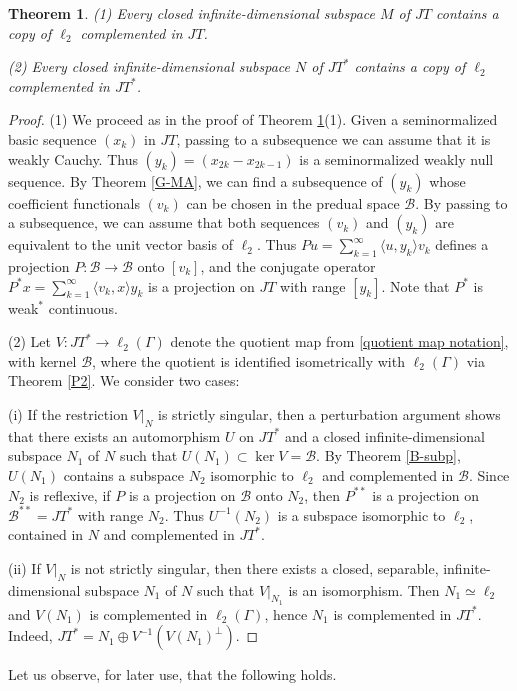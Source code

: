 \documentclass[12pt]{amsart}
\theoremstyle{plain}
\numberwithin{equation}{section}
\newcommand{\B}{\mathcal{B}}
\newtheorem{theorem}{Theorem}[section]
\begin{document}
\begin{theorem}\label{JT-subp}
(1) Every closed infinite-dimensional subspace $M$ of $JT$ contains a copy of $\ell_2$ complemented in $JT$.

(2) Every closed infinite-dimensional subspace $N$ of $JT^*$ contains a copy of $\ell_2$ complemented in $JT^*$.
\end{theorem}
\begin{proof} 
(1) We proceed as in the proof of Theorem \ref{JT-subp}(1).
Given a seminormalized basic sequence $(x_k)$ in $JT$, passing to a subsequence we can assume that it is weakly Cauchy.
Thus $(y_k)= (x_{2k}-x_{2k-1})$ is a seminormalized weakly null sequence.
By Theorem \ref{G-MA}, we can find a subsequence of $(y_k)$ whose coefficient functionals $(v_k)$ can be chosen in the predual space $\B$.
By passing to a subsequence, we can assume that both sequences $(v_k)$ and $(y_k)$ are equivalent
to the unit vector basis of $\ell_2$.
Thus $Pu = \sum_{k=1}^\infty \langle u,y_k\rangle v_k$ defines a projection $P:\B\to\B$ onto $[v_k]$, and the conjugate operator
$P^*x= \sum_{k=1}^\infty \langle v_k,x\rangle y_k$ is a projection on $JT$ with range $[y_k]$. Note that $P^*$ is weak$^*$ continuous.

(2) Let $V:JT^*\to\ell_2(\Gamma)$ denote the quotient map from \eqref{quotient map notation}, with kernel $\B$, where
the quotient is identified isometrically with $\ell_2(\Gamma)$ via Theorem \ref{P2}. We consider two cases:

(i) If the restriction $V|_N$ is strictly singular, then a perturbation argument shows that there exists an automorphism $U$ on $JT^*$ and a closed infinite-dimensional subspace $N_1$ of $N$ such that $U(N_1)\subset \ker V =\B$. By Theorem \ref{B-subp}, $U(N_1)$ contains a subspace $N_2$ isomorphic to $\ell_2$ and complemented in $\B$. Since $N_2$ is reflexive, if $P$ is a projection on $\B$ onto $N_2$, then $P^{**}$ is a projection on $\B^{**}= JT^*$ with range $N_2$. Thus $U^{-1}(N_2)$ is a subspace isomorphic to $\ell_2$, contained in $N$ and complemented in $JT^*$.

(ii) If $V|_N$ is not strictly singular, then there exists a closed, separable, infinite-dimensional subspace $N_1$ of $N$ such that $V|_{N_1}$
is an isomorphism. Then $N_1\simeq \ell_2$ and $V(N_1)$ is complemented in $\ell_2(\Gamma)$, hence $N_1$ is complemented in $JT^*$.
Indeed, $JT^* = N_1\oplus V^{-1}(V(N_1)^\perp)$.
\end{proof}

Let us observe, for later use, that the following holds.
\end{document}
